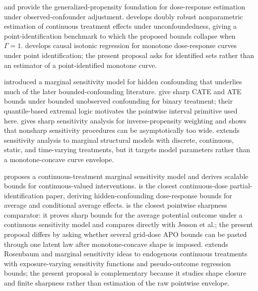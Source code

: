 \documentclass[11pt]{article}
\theoremstyle{definition}
\theoremstyle{plain}
\theoremstyle{remark}
\begin{document}
\citet{Imbens2000} and \citet{HiranoImbens2004} provide the generalized-propensity foundation for dose-response estimation under observed-confounder adjustment.  \citet{KennedyMaMcHughSmall2017} develops doubly robust nonparametric estimation of continuous treatment effects under unconfoundedness, giving a point-identification benchmark to which the proposed bounds collapse when \(\Gamma=1\).  \citet{WestlingGilbertCarone2020} develops causal isotonic regression for monotone dose-response curves under point identification; the present proposal asks for identified sets rather than an estimator of a point-identified monotone curve.

\citet{Tan2006} introduced a marginal sensitivity model for hidden confounding that underlies much of the later bounded-confounding literature.  \citet{YadlowskyNamkoongBasuDuchiTian2022} give sharp CATE and ATE bounds under bounded unobserved confounding for binary treatment; their quantile-based extremal logic motivates the pointwise interval primitive used here.  \citet{DornGuo2023} gives sharp sensitivity analysis for inverse-propensity weighting and shows that nonsharp sensitivity procedures can be asymptotically too wide.  \citet{BonviniKennedyVenturaWasserman2022} extends sensitivity analysis to marginal structural models with discrete, continuous, static, and time-varying treatments, but it targets model parameters rather than a monotone-concave curve envelope.

\citet{JessonDouglasManshausenSolalMeinshausenStierGalShalit2022} proposes a continuous-treatment marginal sensitivity model and derives scalable bounds for continuous-valued interventions.  \citet{MarmarelisHaddadJessonJahanshadGalstyanVerSteeg2023} is the closest continuous-dose partial-identification paper, deriving hidden-confounding dose-response bounds for average and conditional average effects.  \citet{BaitairianSebastienJreichKatsahianGuilloux2025} is the closest pointwise sharpness comparator: it proves sharp bounds for the average potential outcome under a continuous sensitivity model and compares directly with Jesson et al.; the present proposal differs by asking whether several grid-dose APO bounds can be pasted through one latent law after monotone-concave shape is imposed.  \citet{DalalTchetgenTchetgen2025} extends Rosenbaum and marginal sensitivity ideas to endogenous continuous treatments with exposure-varying sensitivity functions and pseudo-outcome regression bounds; the present proposal is complementary because it studies shape closure and finite sharpness rather than estimation of the raw pointwise envelope.
\end{document}
